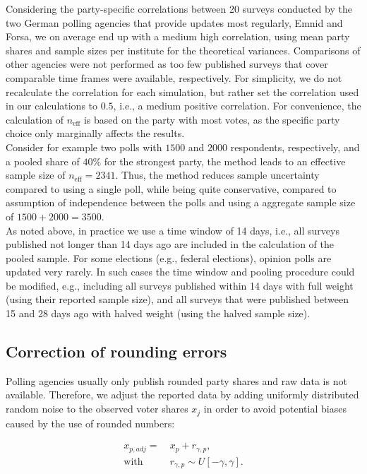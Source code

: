 \documentclass[smallcondensed]{svjour3}     %
\begin{document}
Considering the party-specific correlations between 20 surveys conducted by the
two German polling agencies that provide updates most regularly, Emnid and Forsa,
we on average end up with a medium high correlation, using mean party shares and
sample sizes per institute for the theoretical variances. Comparisons of other
agencies were not performed as too few published surveys that
cover comparable time frames were available, respectively. For simplicity, we do
not recalculate the correlation for each simulation, but rather set the correlation
used in our calculations to $0.5$, i.e., a medium positive correlation.
For convenience, the calculation of $n_{\text{eff}}$ is based on the party with
most votes, as the specific party choice only marginally affects the results.\\

Consider for example two polls with $1500$ and $2000$ respondents,
respectively, and a pooled share of $40\%$ for the strongest party, the method
leads to an effective sample size of $n_{\text{eff}} = 2341$. Thus, the method
reduces sample uncertainty compared to using a single poll, while being quite
conservative, compared to assumption of independence between the polls and using
a aggregate sample size of $1500 + 2000 = 3500$.\\

As noted above, in practice we use a time window of 14 days, i.e., all surveys
published not longer than 14 days ago are included in the calculation of the pooled
sample. For some elections (e.g., federal elections), opinion polls are
updated very rarely. In such cases the time window and pooling procedure
could be modified, e.g., including all surveys published within 14 days with full
weight (using their reported sample size), and all surveys that were published
between 15 and 28 days ago with halved weight (using the halved sample size).



\subsection{Correction of rounding errors}\label{ssec:rounding}
Polling agencies usually only publish rounded party shares and
raw data is not available. Therefore, we adjust the reported data by adding
uniformly distributed random noise to the observed voter shares $x_j$ in order
to avoid potential biases caused by the use of rounded numbers:

\begin{equation}
\begin{aligned}
x_{p,adj} = \ &x_p + r_{\gamma,p}, \\
\text{with} \ \ \ \ \ &r_{\gamma,p} \sim U[-\gamma,\gamma].
\end{aligned}
\end{equation}
\end{document}
